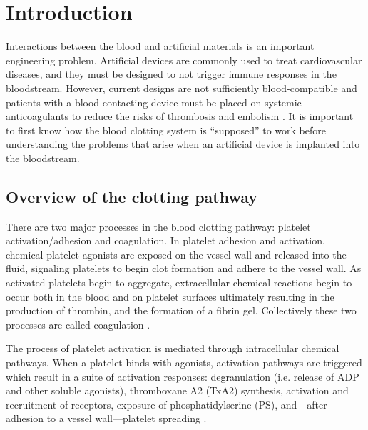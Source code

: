 
\chapter{Introduction}
\label{cha:introduction}


Interactions between the blood and artificial materials is an
important engineering problem. Artificial devices are commonly used to
treat cardiovascular diseases, and they must be designed to not
trigger immune responses in the bloodstream. However, current designs
are not sufficiently blood-compatible and patients with a
blood-contacting device must be placed on systemic anticoagulants to
reduce the risks of thrombosis and embolism
\cite{Ratner1993,Ratner2007,Oprea13}. %
It is important to first know
how the blood clotting system is ``supposed'' to work before
understanding the problems that arise when an artificial device is
implanted into the bloodstream.
	

\section{Overview of the clotting pathway}
\label{sec:overview-clotting}

There are two major processes in the blood clotting pathway: platelet
activation/adhesion and coagulation. In platelet adhesion and
activation, chemical platelet agonists are exposed on the vessel wall
and released into the fluid, signaling platelets to begin clot
formation and adhere to the vessel wall. As activated platelets begin
to aggregate, extracellular chemical reactions begin to occur both in
the blood and on platelet surfaces ultimately resulting in the
production of thrombin, and the formation of a fibrin
gel. Collectively these two processes are called coagulation
\cite{Fogelson2015}. 

The process of platelet activation is mediated through
intracellular chemical pathways. When a platelet binds with agonists,
activation pathways are triggered which result in a suite of
activation responses: degranulation (i.e. release of ADP and other
soluble agonists), thromboxane A2 (TxA2) synthesis, activation and
recruitment of  receptors, exposure of
phosphatidylserine (PS), and---after adhesion to a vessel
wall---platelet spreading \cite{Bye2016}.

